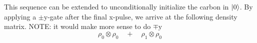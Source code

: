 This sequence can be extended to unconditionally initialize the carbon in ${\left\vert{0}\right\rangle}$. By applying a $\pm{\mathrm{y}}$-gate after the final x-pulse, we arrive at the following density matrix. NOTE: it would make more sense to do $\mp \mathrm{y}$
\begin{equation}
\rho_0\otimes \rho_0 \quad + \quad \rho_1\otimes \rho_{0}
\end{equation}





